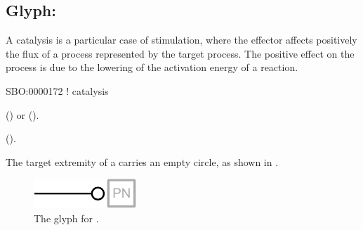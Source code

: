 \subsection{Glyph: }
\label{sec:catalysis}

A catalysis is a particular case of stimulation, where the effector affects positively the flux of a process represented by the target process. The positive effect on the process is due to the lowering of the activation energy of a reaction.

\begin{glyphDescription}

\glyphSboTerm
SBO:0000172 ! catalysis

\glyphOrigin
{}  () or   ().

\glyphTarget
{}  ().

\glyphSymbol The target extremity of a  carries an empty circle, as shown in .

\end{glyphDescription}

\begin{figure}[H]
  \centering
  \includegraphics{images/catalysis}
  \caption{The \PD glyph for .}
  \label{fig:catalysis}
\end{figure}
